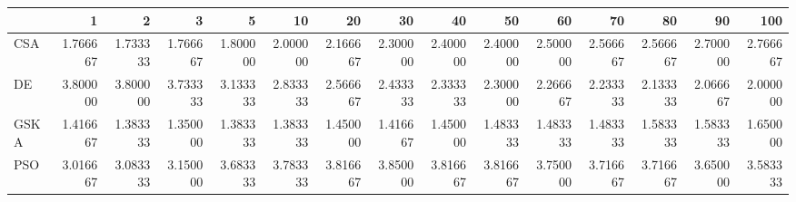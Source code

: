 \begin{tabular}{lrrrrrrrrrrrrrr}
\toprule
{} &       1   &       2   &       3   &       5   &       10  &       20  &       30  &       40  &       50  &       60  &       70  &       80  &       90  &       100 \\
\midrule
CSA  &  1.766667 &  1.733333 &  1.766667 &  1.800000 &  2.000000 &  2.166667 &  2.300000 &  2.400000 &  2.400000 &  2.500000 &  2.566667 &  2.566667 &  2.700000 &  2.766667 \\
DE   &  3.800000 &  3.800000 &  3.733333 &  3.133333 &  2.833333 &  2.566667 &  2.433333 &  2.333333 &  2.300000 &  2.266667 &  2.233333 &  2.133333 &  2.066667 &  2.000000 \\
GSKA &  1.416667 &  1.383333 &  1.350000 &  1.383333 &  1.383333 &  1.450000 &  1.416667 &  1.450000 &  1.483333 &  1.483333 &  1.483333 &  1.583333 &  1.583333 &  1.650000 \\
PSO  &  3.016667 &  3.083333 &  3.150000 &  3.683333 &  3.783333 &  3.816667 &  3.850000 &  3.816667 &  3.816667 &  3.750000 &  3.716667 &  3.716667 &  3.650000 &  3.583333 \\
\bottomrule
\end{tabular}
